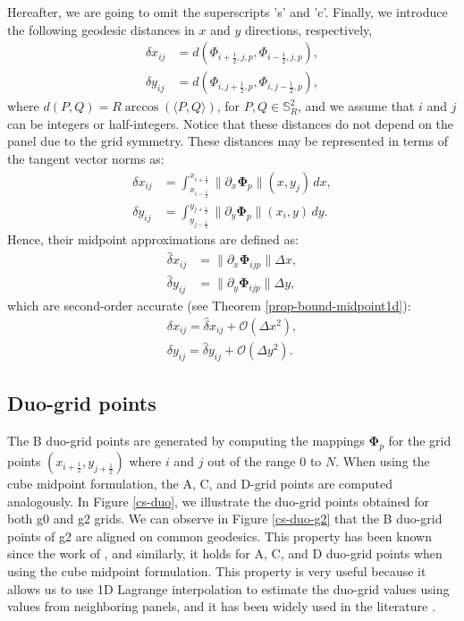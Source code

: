 Hereafter, we are going to omit the superscripts 's' and 'c'.
Finally, we introduce the following geodesic distances in $x$ and $y$ directions, respectively,
\begin{align}
	{\delta} x_{ij} &= d(\Phi_{i+\frac{1}{2},j,p},\Phi_{i-\frac{1}{2},j,p}) ,\\
	{\delta} y_{ij} &= d(\Phi_{i,j+\frac{1}{2},p},\Phi_{i,j-\frac{1}{2},p}),
\end{align}
where $d(P,Q) = R\arccos{(\langle P, Q \rangle)}$, for $P,Q \in \mathbb{S}^2_R$, and we assume that $i$ and $j$ can be integers or half-integers.
Notice that these distances do not depend on the panel due to the grid symmetry.
These distances may be represented in terms of the tangent vector norms as:
\begin{align}
	{\delta} x_{ij} &= 
	\int_{x_{i-\frac{1}{2}}}^{x_{i+\frac{1}{2}}}
	\|\partial_x  \mathbf{\Phi}_{p}\|(x,y_j) \,dx ,\\
	{\delta} y_{ij} &=
	\int_{y_{j-\frac{1}{2}}}^{y_{j+\frac{1}{2}}}
	\|\partial_y \mathbf{\Phi}_{p}\|(x_i,y) \,dy.
\end{align}
Hence, their midpoint approximations are defined as:
\begin{align}
	\hat{\delta} x_{ij} &= \|\partial_x \mathbf{\Phi}_{ijp} \|\Delta x,\\
	\hat{\delta} y_{ij} &= \|\partial_y \mathbf{\Phi}_{ijp} \|\Delta y,
\end{align}
which are second-order accurate (see Theorem \ref{prop-bound-midpoint1d}):
\begin{align}
\delta x_{ij} = \hat{\delta} x_{ij} + \mathcal{O}(\Delta x^2),\\
\delta y_{ij} = \hat{\delta} y_{ij} + \mathcal{O}(\Delta y^2).
\end{align}
\subsection{Duo-grid points}
\label{duogrid-points}
The B duo-grid points are generated by computing the mappings $\boldsymbol{\Phi}_p$ for the grid points 
$(x_{i+\frac{1}{2}}, y_{j+\frac{1}{2}})$ where $i$ and $j$ out of the range $0$ to $N$. 
When using the cube midpoint formulation, the A, C, and D-grid points are computed analogously.
In Figure \ref{cs-duo}, we illustrate the duo-grid points obtained for both g0 and g2 grids.
We can observe in Figure \ref{cs-duo-g2} that the B duo-grid points of g2 are aligned on common geodesics.
This property has been known since the work of \citet{ronchi:1996}, and similarly, it holds for A, C, and D duo-grid points when using the cube midpoint formulation.
This property is very useful because it allows us to use 1D Lagrange interpolation to estimate the duo-grid values using values 
from neighboring panels, and it has been widely used in the literature \citep{ross:2006, croisille:2013,katta:2015,katta:2015b, chen:2021}.

